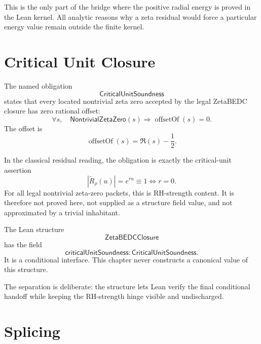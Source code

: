 This is the only part of the bridge where the positive radial energy is
proved in the Lean kernel. All analytic reasons why a zeta residual would
force a particular energy value remain outside the finite kernel.

\section{Critical Unit Closure}
\label{sec:rh-zeta-critical-unit-critical-unit-closure}

\begin{definition}[CriticalUnitSoundness]
\label{def:rh-zeta-critical-unit-soundness}
The named obligation
$$
\mathsf{CriticalUnitSoundness}
$$
states that every located nontrivial zeta zero accepted by the legal
ZetaBEDC closure has zero rational offset:
$$
\forall s,\quad
\mathsf{NontrivialZetaZero}(s)
\Longrightarrow
\operatorname{offsetOf}(s)=0.
$$
The offset is
$$
\operatorname{offsetOf}(s)=\Re(s)-\frac12.
$$
\end{definition}

\begin{principle}
\label{prin:rh-zeta-critical-unit-hinge-equivalence}
In the classical residual reading, the obligation is exactly the
critical-unit assertion
$$
|\widetilde R_{\rho}(u)|=e^{ru}\equiv 1
\Longleftrightarrow
r=0.
$$
For all legal nontrivial zeta-zero packets, this is RH-strength content.
It is therefore not proved here, not supplied as a structure field value,
and not approximated by a trivial inhabitant.
\end{principle}

\begin{definition}[ZetaBEDCClosure]
\label{def:rh-zeta-critical-unit-closure}
The Lean structure
$$
\mathsf{ZetaBEDCClosure}
$$
has the field
$$
\mathsf{criticalUnitSoundness}:
\mathsf{CriticalUnitSoundness}.
$$
It is a conditional interface. This chapter never constructs a canonical
value of this structure.
\end{definition}

The separation is deliberate: the structure lets Lean verify the final
conditional handoff while keeping the RH-strength hinge visible and
undischarged.

\section{Splicing}
\label{sec:rh-zeta-critical-unit-splicing}

